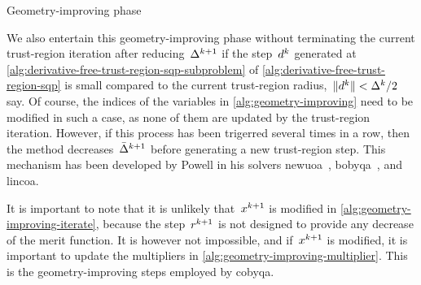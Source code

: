 \begin{algorithm}
    \caption{Geometry-improving phase}
    \label{alg:geometry-improving}
    \DontPrintSemicolon
\end{algorithm}

We also entertain this geometry-improving phase without terminating the current trust-region iteration after reducing~$\rad[k + 1]$ if the step~$\step[k]$ generated at \cref{alg:derivative-free-trust-region-sqp-subproblem} of \cref{alg:derivative-free-trust-region-sqp} is small compared to the current trust-region radius,~$\norm{\step[k]} < \rad[k] / 2$ say.
Of course, the indices of the variables in \cref{alg:geometry-improving} need to be modified in such a case, as none of them are updated by the trust-region iteration.
However, if this process has been trigerred several times in a row, then the method decreases~$\radlb[k + 1]$ before generating a new trust-region step.
This mechanism has been developed by Powell in his solvers \gls{newuoa}~\cite{Powell_2006}, \gls{bobyqa}~\cite{Powell_2009}, and \gls{lincoa}.

It is important to note that it is unlikely that~$\iter[k + 1]$ is modified in \cref{alg:geometry-improving-iterate}, because the step~$\rstep[k + 1]$ is not designed to provide any decrease of the merit function.
It is however not impossible, and if~$\iter[k + 1]$ is modified, it is important to update the multipliers in \cref{alg:geometry-improving-multiplier}.
This is the geometry-improving steps employed by \gls{cobyqa}.

